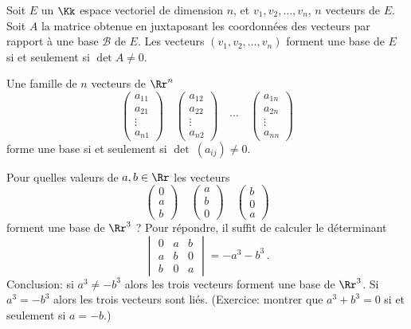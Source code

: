 \documentclass[class=report,crop=false]{standalone}
\begin{document}
\begin{theoreme}
\label{th:detbase}
Soit $E$ un $\Kk$ espace vectoriel de dimension $n$, et $v_1,v_2,\ldots,v_n$,
$n$ vecteurs de $E$. Soit $A$ la matrice obtenue en juxtaposant les coordonnées des vecteurs
par rapport à une base $\mathcal{B}$ de $E$.
Les vecteurs $(v_1,v_2,\ldots,v_n)$ forment une base de $E$
si et seulement si $\det A \neq 0.$
\end{theoreme}


\begin{corollaire}
Une famille de $n$ vecteurs de $\Rr^n$
$$\begin{pmatrix}a_{11}\\a_{21}\\\vdots\\a_{n1}\end{pmatrix}
\quad
\begin{pmatrix}a_{12}\\a_{22}\\\vdots\\a_{n2}\end{pmatrix}
\quad \cdots
\quad
\begin{pmatrix}a_{1n}\\a_{2n}\\\vdots\\a_{nn}\end{pmatrix}$$
forme une base si et seulement si
$\det \ (a_{ij}) \neq 0$.
\end{corollaire}

\begin{exemple}
Pour quelles valeurs de $a,b \in \Rr$ les vecteurs
$$
\begin{pmatrix}0\\a\\b\end{pmatrix} \quad
\begin{pmatrix}a\\b\\0\end{pmatrix} \quad
\begin{pmatrix}b\\0\\a\end{pmatrix}$$
forment une base de $\Rr^3$ ? Pour répondre, il suffit de calculer le déterminant
\[
\begin{vmatrix}
  0 & a & b\\a & b & 0\\b & 0 & a
  \end{vmatrix}
= - a^3 - b^3 \,.
\]
Conclusion: si $a^3 \neq - b^3$ alors les trois vecteurs forment une base de $\Rr^3$.
Si $a^3 = - b^3$ alors les trois vecteurs sont liés.
(Exercice: montrer que $a^3+b^3=0$ si et seulement si $a=-b$.)
\end{exemple}
\end{document}
